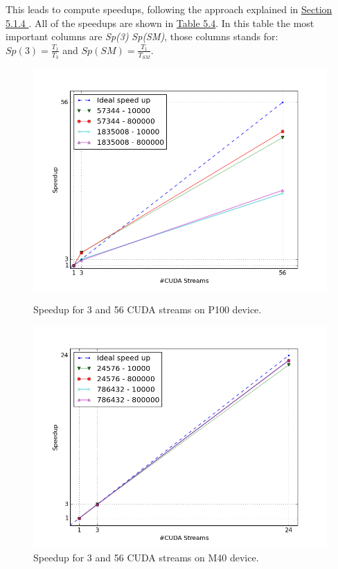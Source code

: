 			
	This leads to compute speedups, following the approach explained in \hyperref[subs:resgath]{Section 5.1.4 }. All of the speedups are shown in \hyperref[subs:resgath]{Table 5.4}. In this table the most important columns are \textit{Sp(3)} \textit{Sp(SM)}, those columns stands for:\\
	\(Sp(3) =  \frac{T_{1}}{T_{3}} \)  and   
	\(Sp(SM) = \frac{T_{1}}{T_{SM}} \).\\
	
	\begin{figure}
		\vspace{-2cm}
		\includegraphics[scale=0.7]{plots/figure_25.png}
		\caption{Speedup for 3 and 56 CUDA streams on P100 device.}
		\label{fig:p100sp}
		\includegraphics[scale=0.7]{plots/figure_26.png}
		\caption{Speedup for 3 and 56 CUDA streams on M40 device.}
		\label{fig:m40sp}
	\end{figure}
